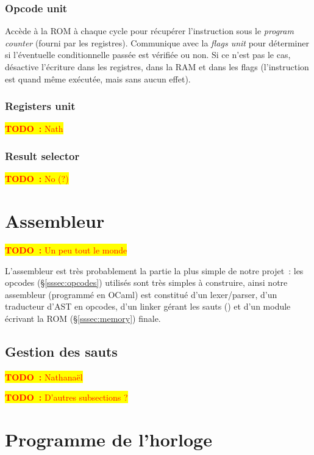 \documentclass[11pt,a4paper]{article}
\newcommand{\htodo}[1]{\begin{huge}\colorbox{yellow}{\textcolor{red}{\textbf{TODO~:} #1}}\end{huge}}
\newcommand{\todo}[1]{\colorbox{yellow}{\textcolor{red}{\textbf{TODO~:} #1}}}
\begin{document}
\subsubsection{Opcode unit} \label{sssec:procunit_opcode}
Accède à la ROM à chaque cycle pour récupérer l'instruction sous le \textit{program counter} (fourni par les registres). Communique avec la \textit{flags unit} pour déterminer si l'éventuelle conditionnelle passée est vérifiée ou non. Si ce n'est pas le cas, désactive l'écriture dans les registres, dans la RAM et dans les flags (l'instruction est quand même exécutée, mais sans aucun effet).

\subsubsection{Registers unit}
\todo{Nath}

\subsubsection{Result selector}
\todo{No (?)}

\section{Assembleur} \label{sec:cas}

\htodo{Un peu tout le monde}

L'assembleur est très probablement la partie la plus simple de notre projet~: les opcodes (§\ref{sssec:opcodes}) utilisés sont très simples à construire, ainsi notre assembleur (programmé en OCaml) est constitué d'un lexer/parser, d'un traducteur d'AST en opcodes, d'un \og linker \fg{} gérant les sauts () et d'un module écrivant la ROM (§\ref{sssec:memory}) finale.

\subsection{Gestion des sauts}
\todo{Nathanaël}

\vspace{1em}\htodo{D'autres subsections ?}


\section{Programme de l'horloge} \label{sec:clock}
\end{document}
